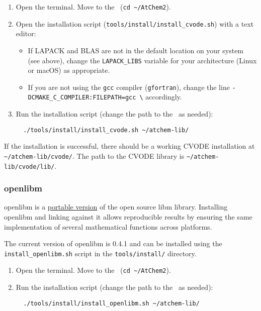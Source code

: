 \begin{enumerate}
\item Open the terminal. Move to the \maindir\ (\verb|cd ~/AtChem2|).
\item Open the installation script
  (\texttt{tools/install/install\_cvode.sh}) with a text editor:
  \begin{itemize}
  \item If LAPACK and BLAS are not in the default location on your
    system (see above), change the \texttt{LAPACK\_LIBS} variable for
    your architecture (Linux or macOS) as appropriate.
  \item If you are not using the \texttt{gcc} compiler
    (\texttt{gfortran}), change the line
    \texttt{-DCMAKE\_C\_COMPILER:FILEPATH=gcc \textbackslash}
    accordingly.
  \end{itemize}
\item Run the installation script (change the path to the \depdir\ as
  needed):
  \begin{verbatim}
  ./tools/install/install_cvode.sh ~/atchem-lib/
  \end{verbatim}
\end{enumerate}

If the installation is successful, there should be a working CVODE
installation at
\texttt{\textasciitilde{}/atchem-lib/cvode/}. The path to the
CVODE library is
\texttt{\textasciitilde{}/atchem-lib/cvode/lib/}.

\subsubsection{openlibm}

openlibm is a \href{https://openlibm.org/}{portable version} of the
open source libm library. Installing openlibm and linking against it
allows reproducible results by ensuring the same implementation of
several mathematical functions across platforms.

The current version of openlibm is 0.4.1 and can be installed using
the \texttt{install\_openlibm.sh} script in the
\texttt{tools/install/} directory.

\begin{enumerate}
\item Open the terminal. Move to the \maindir\ (\verb|cd ~/AtChem2|).
\item Run the installation script (change the path to the \depdir\ as
  needed):
  \begin{verbatim}
  ./tools/install/install_openlibm.sh ~/atchem-lib/
  \end{verbatim}
\end{enumerate}

